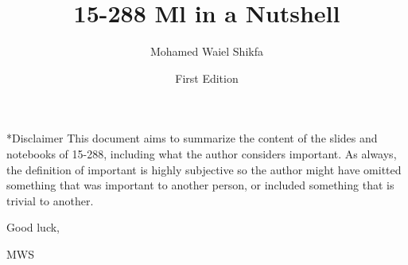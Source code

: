 \documentclass[notitlepage]{report}
\title{\textcolor{chaptergreen}{15-288 Ml in a Nutshell}}
\date{First Edition}
\author{Mohamed Waiel Shikfa}
\makeatletter
\def\chapter{\@ifstar\@schapter\@chapter}
\def\@chapter#1{%
  \refstepcounter{chapter}%
  \addcontentsline{toc}{chapter}{\protect\numberline{\thechapter}#1}%
  \chaptermark{#1}%
  {\par\vspace{2em}\centering\LARGE\bfseries
   \textcolor{chaptergreen}{Chapter \thechapter\\#1}\par\vspace{1em}}%
}
\def\@schapter#1{%
  {\par\vspace{1em}\centering\LARGE\bfseries
   \textcolor{chaptergreen}{#1}\par\vspace{1em}}%
}
\makeatother
\begin{document}
\maketitle

\chapter*{Disclaimer}
This document aims to summarize the content of the slides and notebooks of 15-288, including
what the author considers important. As always, the definition of important is
highly subjective so the author might have omitted something that was
important to another person, or included something that is trivial to another.

Good luck,

MWS

\tableofcontents
\clearpage

\clearpage
\clearpage
\clearpage
\clearpage
\clearpage
\clearpage
\clearpage

\clearpage
\clearpage
\clearpage
\clearpage
\clearpage
\clearpage

\clearpage
\clearpage
\clearpage
\clearpage
\clearpage
\end{document}
